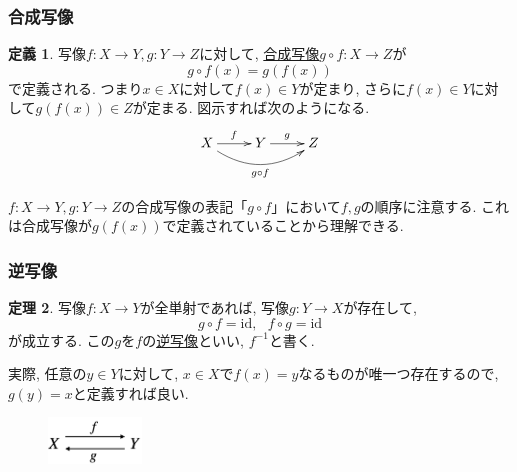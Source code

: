 \documentclass[dvipdfmx,cjk,10.2pt]{beamer}
\newcommand{\id}{\mathrm{id}}
\theoremstyle{definition}
\newtheorem{Thm}{定理}[section]
\newtheorem{Def}[Thm]{定義}
\begin{document}
\begin{frame}
\frametitle{合成写像}

\begin{Def}
写像$f:X \rightarrow Y, g:Y\rightarrow Z$に対して, \underline{合成写像}$g\circ f: X\rightarrow Z$が
$$
g\circ f(x)=g(f(x))
$$
で定義される. つまり$x \in X$に対して$f(x) \in Y$が定まり, さらに$f(x) \in Y$に対して$g(f(x)) \in Z$が定まる. 
図示すれば次のようになる. 
$$
\xymatrix{
X \ar[r]^{f} \ar@/_15pt/[rr]_{g\circ f} &  Y \ar[r]^{g}& Z
}
$$
\end{Def}

$f:X \rightarrow Y, g:Y\rightarrow Z$の合成写像の表記「$g\circ f$」において$f,g$の順序に注意する. 
これは合成写像が$g(f(x))$で定義されていることから理解できる. 


\end{frame}




\begin{frame}
\frametitle{逆写像}


\begin{Thm}
写像$f:X\rightarrow Y$が全単射であれば, 写像$g:Y\rightarrow X$が存在して, 
$$
g\circ f = \id, \ \ \ f \circ g = \id
$$
が成立する. 
この$g$を$f$の\underline{逆写像}といい, $f^{-1}$と書く. 
\end{Thm}

実際, 任意の$y \in Y$に対して, $x \in X$で$f(x)=y$なるものが唯一つ存在するので, $g(y)=x$と定義すれば良い. 
\vspace{-2mm}

 \begin{figure}[htbp]
 \begin{center} 
  \includegraphics[width=25mm]{inverse.png}
 \end{center}
\end{figure}

\end{frame}




\end{document}
